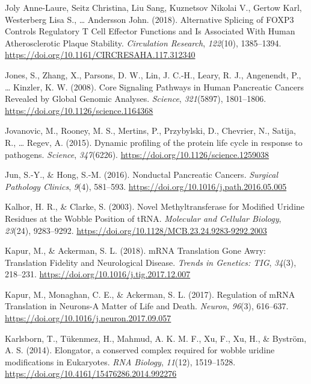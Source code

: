 \documentclass[12pt,openany]{book}
\begin{document}
\hypertarget{ref-JolyAnne-Laure2018}{}
Joly Anne-Laure, Seitz Christina, Liu Sang, Kuznetsov Nikolai V., Gertow
Karl, Westerberg Lisa S., \ldots{} Andersson John. (2018). Alternative
Splicing of FOXP3 Controls Regulatory T Cell Effector Functions and Is
Associated With Human Atherosclerotic Plaque Stability.
\emph{Circulation Research}, \emph{122}(10), 1385--1394.
\url{https://doi.org/10.1161/CIRCRESAHA.117.312340}

\hypertarget{ref-Jones2008}{}
Jones, S., Zhang, X., Parsons, D. W., Lin, J. C.-H., Leary, R. J.,
Angenendt, P., \ldots{} Kinzler, K. W. (2008). Core Signaling Pathways
in Human Pancreatic Cancers Revealed by Global Genomic Analyses.
\emph{Science}, \emph{321}(5897), 1801--1806.
\url{https://doi.org/10.1126/science.1164368}

\hypertarget{ref-Jovanovic2015}{}
Jovanovic, M., Rooney, M. S., Mertins, P., Przybylski, D., Chevrier, N.,
Satija, R., \ldots{} Regev, A. (2015). Dynamic profiling of the protein
life cycle in response to pathogens. \emph{Science}, \emph{347}(6226).
\url{https://doi.org/10.1126/science.1259038}

\hypertarget{ref-Jun2016}{}
Jun, S.-Y., \& Hong, S.-M. (2016). Nonductal Pancreatic Cancers.
\emph{Surgical Pathology Clinics}, \emph{9}(4), 581--593.
\url{https://doi.org/10.1016/j.path.2016.05.005}

\hypertarget{ref-Kalhor2003}{}
Kalhor, H. R., \& Clarke, S. (2003). Novel Methyltransferase for
Modified Uridine Residues at the Wobble Position of tRNA.
\emph{Molecular and Cellular Biology}, \emph{23}(24), 9283--9292.
\url{https://doi.org/10.1128/MCB.23.24.9283-9292.2003}

\hypertarget{ref-Kapur2018}{}
Kapur, M., \& Ackerman, S. L. (2018). mRNA Translation Gone Awry:
Translation Fidelity and Neurological Disease. \emph{Trends in Genetics:
TIG}, \emph{34}(3), 218--231.
\url{https://doi.org/10.1016/j.tig.2017.12.007}

\hypertarget{ref-Kapur2017}{}
Kapur, M., Monaghan, C. E., \& Ackerman, S. L. (2017). Regulation of
mRNA Translation in Neurons-A Matter of Life and Death. \emph{Neuron},
\emph{96}(3), 616--637.
\url{https://doi.org/10.1016/j.neuron.2017.09.057}

\hypertarget{ref-Karlsborn2014}{}
Karlsborn, T., Tükenmez, H., Mahmud, A. K. M. F., Xu, F., Xu, H., \&
Byström, A. S. (2014). Elongator, a conserved complex required for
wobble uridine modifications in Eukaryotes. \emph{RNA Biology},
\emph{11}(12), 1519--1528.
\url{https://doi.org/10.4161/15476286.2014.992276}
\end{document}

